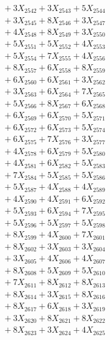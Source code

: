 \documentclass[a4paper,10pt]{article}
\begin{document}
{\begin{align}
&\;  + 3 X_{2542} + 3 X_{2543} + 5 X_{2544} \\[0.3ex]
&\;  + 3 X_{2545} + 8 X_{2546} + 3 X_{2547} \\[0.3ex]
&\;  + 4 X_{2548} + 8 X_{2549} + 3 X_{2550} \\[0.3ex]
&\;  + 5 X_{2551} + 5 X_{2552} + 4 X_{2553} \\[0.3ex]
&\;  + 5 X_{2554} + 7 X_{2555} + 4 X_{2556} \\[0.3ex]
&\;  + 8 X_{2557} + 6 X_{2558} + 8 X_{2559} \\[0.5ex]\allowbreak
&\;  + 6 X_{2560} + 6 X_{2561} + 3 X_{2562} \\[0.3ex]
&\;  + 3 X_{2563} + 6 X_{2564} + 7 X_{2565} \\[0.3ex]
&\;  + 5 X_{2566} + 8 X_{2567} + 6 X_{2568} \\[0.3ex]
&\;  + 6 X_{2569} + 6 X_{2570} + 5 X_{2571} \\[0.3ex]
&\;  + 6 X_{2572} + 6 X_{2573} + 5 X_{2574} \\[0.3ex]
&\;  + 6 X_{2575} + 7 X_{2576} + 3 X_{2577} \\[0.3ex]
&\;  + 4 X_{2578} + 6 X_{2579} + 5 X_{2580} \\[0.3ex]
&\;  + 4 X_{2581} + 6 X_{2582} + 5 X_{2583} \\[0.3ex]
&\;  + 7 X_{2584} + 5 X_{2585} + 5 X_{2586} \\[0.3ex]
&\;  + 5 X_{2587} + 4 X_{2588} + 4 X_{2589} \\[0.5ex]\allowbreak
&\;  + 4 X_{2590} + 4 X_{2591} + 6 X_{2592} \\[0.3ex]
&\;  + 5 X_{2593} + 6 X_{2594} + 7 X_{2595} \\[0.3ex]
&\;  + 5 X_{2596} + 5 X_{2597} + 5 X_{2598} \\[0.3ex]
&\;  + 8 X_{2599} + 4 X_{2600} + 7 X_{2601} \\[0.3ex]
&\;  + 8 X_{2602} + 3 X_{2603} + 3 X_{2604} \\[0.3ex]
&\;  + 3 X_{2605} + 4 X_{2606} + 4 X_{2607} \\[0.3ex]
&\;  + 8 X_{2608} + 5 X_{2609} + 5 X_{2610} \\[0.3ex]
&\;  + 7 X_{2611} + 8 X_{2612} + 8 X_{2613} \\[0.3ex]
&\;  + 8 X_{2614} + 3 X_{2615} + 8 X_{2616} \\[0.3ex]
&\;  + 8 X_{2617} + 6 X_{2618} + 3 X_{2619} \\[0.5ex]\allowbreak
&\;  + 3 X_{2620} + 8 X_{2621} + 8 X_{2622} \\[0.3ex]
&\;  + 8 X_{2623} + 3 X_{2624} + 4 X_{2625} \\[0.3ex]

\end{align}}
\end{document}
